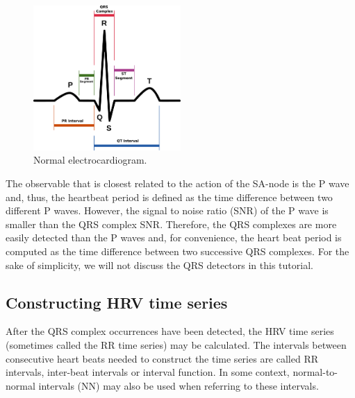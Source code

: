 \documentclass[12pt,lot, lof]{puthesis}
\begin{document}
\begin{figure}[ht]
\begin{center}
\includegraphics[width=0.5\textwidth]{figures/ecgFree.pdf}
\caption{\label{fig:ecg} Normal electrocardiogram.}
\end{center}
\end{figure} 

The observable that is closest related to the action of the SA-node is the P 
wave and, thus,
the heartbeat period is defined as the time difference between two different P 
waves. However, the signal to noise ratio (SNR) 
of the P wave is smaller than the QRS complex SNR. Therefore, the QRS complexes 
are more
easily detected than the P waves and, for convenience, the heart beat period is 
computed as the time difference
between two successive QRS complexes. For the sake of simplicity, we will not 
discuss the QRS detectors in this tutorial.\\


\subsection{Constructing HRV time series}

After the QRS complex occurrences have been detected, the \gls{HRV} time series 
(sometimes called the RR time series) may be calculated.
The intervals between consecutive heart beats needed to construct the time 
series are called RR intervals, inter-beat intervals or interval function.
In some context, normal-to-normal intervals (NN) may also be used when 
referring to these intervals. \\
\end{document}

